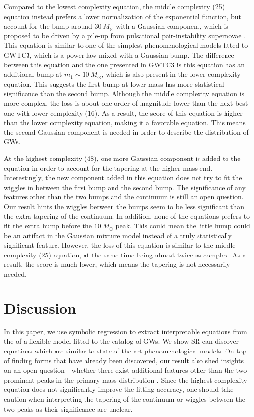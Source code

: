 \documentclass[nohyperref]{article}
\theoremstyle{plain}
\theoremstyle{definition}
\theoremstyle{remark}
\begin{document}
Compared to the lowest complexity equation, the middle complexity (25) equation instead prefers a lower normalization of the exponential function,
but account for the bump around $30\ M_{\odot}$ with a Gaussian component,
which is proposed to be driven by a pile-up from pulsational pair-instability supernovae \cite{Talbot:2018cva}.
This equation is similar to one of the simplest phenomenological models fitted to GWTC3, which is a power law mixed with a Gaussian bump.
The difference between this equation and the one presented in GWTC3 is this equation has an additional bump at $m_{1}\sim 10\ M_{\odot}$,
which is also present in the lower complexity equation.
This suggests the first bump at lower mass has more statistical significance than the second bump.
Although the middle complexity equation is more complex, the loss is about one order of magnitude lower than the next best one with lower complexity (16).
As a result, the score of this equation is higher than the lower complexity equation, making it a favorable equation. This means the second Gaussian component is needed in order to describe the distribution of GWs.

At the highest complexity (48), one more Gaussian component is added to the equation in order to account for the tapering at the higher mass end. 
Interestingly, the new component added in this equation does not try to fit the wiggles in between the first bump and the second bump.
The significance of any features other than the two bumps and the continuum is still an open question.
Our result hints the wiggles between the bumps seem to be less significant than the extra tapering of the continuum.
In addition, none of the equations prefers to fit the extra hump before the $10\ M_{\odot}$ peak.
This could mean the little hump could be an artifact in the Gaussian mixture model instead of a truly statistically significant feature.
However, the loss of this equation is similar to the middle complexity (25) equation, at the same time being almost twice as complex. As a result, the score is much lower, which means the tapering is not necessarily needed.

\section{Discussion}
\label{sec:discussion}

In this paper, we use symbolic regression to extract interpretable equations from the \ppd of a flexible model fitted to the catalog of GWs.
We show SR can discover equations which are similar to state-of-the-art phenomenological models.
On top of finding forms that have already been discovered,
our result also shed insights on an open question---whether there exist additional features other than the two prominent peaks in the primary mass distribution \cite{Tiwari:2021yvr}.
Since the highest complexity equation does not significantly improve the fitting accuracy, one should take caution when interpreting the tapering of the continuum or wiggles between the two peaks as their significance are unclear.
\end{document}
